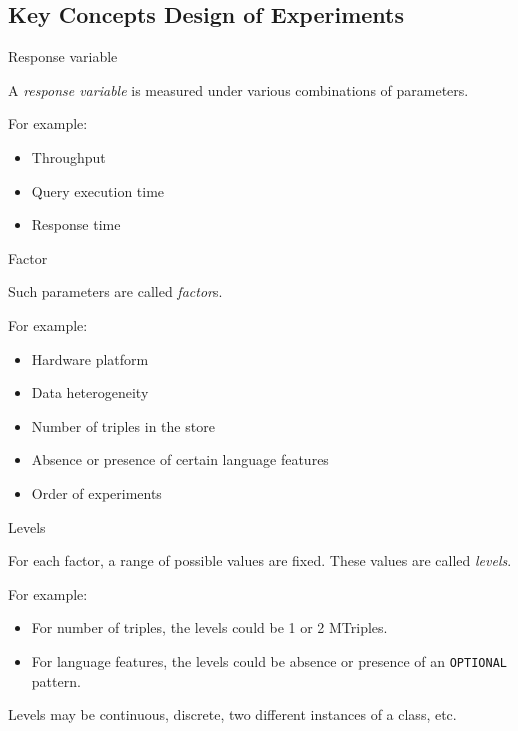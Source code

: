 \documentclass[english,handout,aspectratio=169]{ifislide}
\begin{document}
\subsection{Key Concepts Design of Experiments}

\begin{frame}{Response variable}

   A \emph{response variable} is measured under various
    combinations of parameters.

For example:
\begin{itemize}
\item Throughput
\item Query execution time
\item Response time
\end{itemize}

\end{frame}

\begin{frame}{Factor}

Such parameters are called \emph{factor}s. 

For example:
\begin{itemize}
\item Hardware platform
\item Data heterogeneity
\item Number of triples in the store
\item Absence or presence of certain language features
\item Order of experiments
\end{itemize}

\end{frame}

\begin{frame}{Levels}

For each factor, a range of possible values are fixed. These values
are called \emph{levels}.

For example:
\begin{itemize}
\item For number of triples, the levels could be 1 or 2 MTriples.
\item For language features, the levels could be absence or presence
  of an \texttt{OPTIONAL} pattern. 
\end{itemize}

Levels may be continuous, discrete, two different instances of a
class, etc.

\end{frame}
\end{document}
